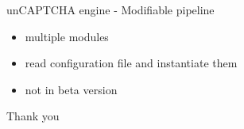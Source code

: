 \documentclass[red]{beamer}
\begin{document}
\begin{frame}{unCAPTCHA engine - Modifiable pipeline}
  \begin{itemize}
    \item multiple modules
    \item read configuration file and instantiate them
    \item not in beta version
  \end{itemize}
\end{frame}

\begin{frame}{Thank you}
  \begin{center}
  \end{center}
\end{frame}
\end{document}
